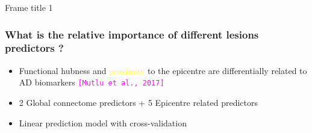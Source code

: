 \documentclass{beamer}
\newcommand{\myciting}[1]{{\footnotesize{\tt{\textcolor{magenta}{[#1]}}}}}
\begin{document}
\begin{frame}{Frame title 1}
\frametitle{What is the relative importance of different lesions predictors ?}
 \begin{itemize}
 \item Functional hubness and \textcolor{yellow}{proximity} to the epicentre are differentially related to AD biomarkers \myciting{Mutlu  et al., 2017}
 \vspace*{0.02\linewidth}
 \item 2 Global connectome predictors + 5 Epicentre related predictors
 \vspace*{0.02\linewidth}
 \item Linear prediction model with cross-validation
 \end{itemize}
\end{frame}
\end{document}

